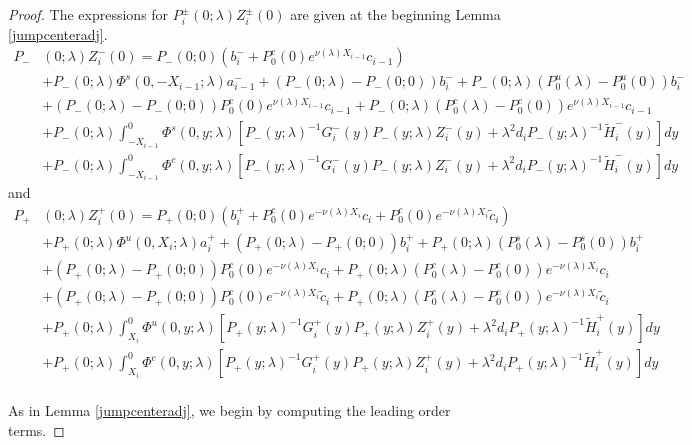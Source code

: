 \documentclass[thesis.tex]{subfiles}
\begin{document}
\begin{lemma}
\begin{proof}
The expressions for $P_i^\pm(0; \lambda) Z_i^\pm(0)$ are given at the beginning Lemma \ref{jumpcenteradj}.
\begin{align*}
P_-&(0; \lambda) Z_i^-(0) = P_-(0; 0)( b_i^- + P_0^c(0) e^{\nu(\lambda) X_{i-1}} c_{i-1} ) \\
&+ P_-(0; \lambda) \Phi^s(0, -X_{i-1}; \lambda) a_{i-1}^- + (P_-(0; \lambda) - P_-(0; 0))b_i^- + P_-(0; \lambda)(P_0^u(\lambda) - P_0^u(0))b_i^- \\
&+ (P_-(0; \lambda) - P_-(0; 0)) P_0^c(0) e^{\nu(\lambda) X_{i-1}} c_{i-1} + P_-(0; \lambda) (P_0^c(\lambda) - P_0^c(0)) e^{\nu(\lambda) X_{i-1}} c_{i-1} \\
&+ P_-(0; \lambda) \int_{-X_{i-1}}^0 \Phi^s(0, y; \lambda) [P_-(y; \lambda)^{-1} G_i^-(y) P_-(y; \lambda)Z_i^-(y) + \lambda^2 d_i P_-(y; \lambda)^{-1} \tilde{H}_i^-(y)] dy \\
&+ P_-(0; \lambda) \int_{-X_{i-1}}^0 \Phi^c(0, y; \lambda) [P_-(y; \lambda)^{-1} G_i^-(y) P_-(y; \lambda)Z_i^-(y) + \lambda^2 d_i P_-(y; \lambda)^{-1} \tilde{H}_i^-(y)] dy
\end{align*}
and
\begin{align*}
P_+&(0; \lambda) Z_i^+(0) = P_+(0; 0)( b_i^+ + P_0^c(0) e^{-\nu(\lambda)X_i} c_i + P_0^c(0) e^{-\nu(\lambda)X_i} \tilde{c}_i )\\
&+ P_+(0; \lambda) \Phi^u(0, X_i; \lambda) a_i^+ + (P_+(0; \lambda) - P_+(0; 0)) b_i^+ + P_+(0; \lambda) (P_0^s(\lambda) - P_0^s(0)) b_i^+ \\
&+ (P_+(0; \lambda) - P_+(0; 0))P_0^c(0) e^{-\nu(\lambda)X_i} c_i + P_+(0; \lambda) (P_0^c(\lambda) - P_0^c(0)) e^{-\nu(\lambda)X_i} c_i \\
&+ (P_+(0; \lambda) - P_+(0; 0))P_0^c(0) e^{-\nu(\lambda)X_i} \tilde{c}_i + P_+(0; \lambda) (P_0^c(\lambda) - P_0^c(0)) e^{-\nu(\lambda)X_i} \tilde{c}_i \\
&+ P_+(0; \lambda) \int_{X_i}^0 \Phi^u(0, y; \lambda) [P_+(y; \lambda)^{-1} G_i^+(y) P_+(y; \lambda) Z_i^+(y) + \lambda^2 d_i P_+(y; \lambda)^{-1} \tilde{H}_i^+(y)] dy \\
&+ P_+(0; \lambda) \int_{X_i}^0 \Phi^c(0, y; \lambda) [P_+(y; \lambda)^{-1} G_i^+(y) P_+(y; \lambda) Z_i^+(y) + \lambda^2 d_i P_+(y; \lambda)^{-1} \tilde{H}_i^+(y)] dy \\
\end{align*}

As in Lemma \ref{jumpcenteradj}, we begin by computing the leading order terms.


\end{proof}
\end{lemma}
\end{document}
